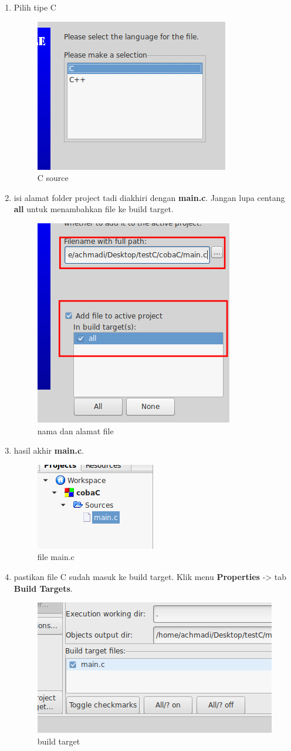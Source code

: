 \documentclass[12pt,]{article}
\begin{document}
\begin{enumerate}
		\item Pilih tipe C
		\begin{figure}[H]
			\centering
			\includegraphics[width=0.35\linewidth]{images/c_cb_6}
			\caption{C source}
		\end{figure}
		\item isi alamat folder project tadi diakhiri dengan \textbf{main.c}.
		Jangan lupa centang \textbf{all} untuk menambahkan file ke build target.
		\begin{figure}[H]
			\centering
			\includegraphics[width=0.35\linewidth]{images/c_cb_7}
			\caption{nama dan alamat file}
		\end{figure}

		\item hasil akhir \textbf{main.c}.
		\begin{figure}[H]
			\centering
			\includegraphics[width=0.35\linewidth]{images/c_cb_8}
			\caption{file main.c}
		\end{figure}

		\item pastikan file C sudah masuk ke build target.
		Klik menu \textbf{Properties} -> tab \textbf{Build Targets}.
		\begin{figure}[H]
			\centering
			\includegraphics[width=0.35\linewidth]{images/c_cb_9}
			\caption{build target}
		\end{figure}


\end{enumerate}
\end{document}
